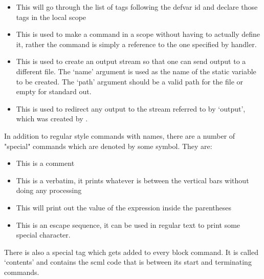 \begin{itemize}
  \item {}
  This will go through the list of tags following the defvar id and declare
  those tags in the local scope

  \item {}
  This is used to make a command in a scope without having to actually define
  it, rather the command is simply a reference to the one specified by handler.

  \item {}
  This is used to create an output stream so that one can send \SCML{} output to a
  different file.  The `name' argument is used as the name of the static
  variable to be created.  The `path' argument should be a valid path for the
  file or empty for standard out.

  \item {}
  This is used to redirect any \SCML{} output to the stream referred to by
  `output', which was created by .
\end{itemize}

In addition to regular style commands with names, there are a number of
"special" commands which are denoted by some symbol.  They are:

\begin{itemize}
  \item \scmlcode{<!-- -->}
  This is a comment

  \item {}
  This is a verbatim, it prints whatever is between the
  vertical bars without doing any processing

  \item {}
  This will print out the value of the expression inside the parentheses

  \item {}
  This is an escape sequence, it can be used in regular
  text to print some special character.
\end{itemize}

There is also a special tag which gets added to every block command.  It is
called `contents' and contains the scml code that is between its start
and terminating commands.

